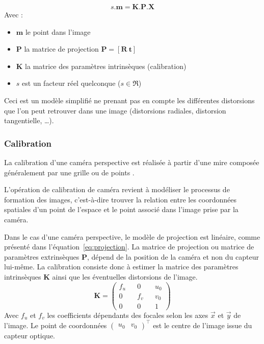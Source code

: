 \begin{equation}
s.\mathbf{m} = \mathbf{K}.\mathbf{P}.\mathbf{X}
\end{equation}
Avec : 
\begin{itemize}
\item $\mathbf{m}$ le point dans l'image
\item $\mathbf{P}$ la matrice de projection 
$\mathbf{P} = [ \mathbf{R} ~ \mathbf{t} ]$
\item $\mathbf{K}$ la matrice des paramètres intrinsèques (calibration)
\item $s$ est un facteur réel quelconque ($s \in \Re$)
\end{itemize}

Ceci est un modèle simplifié ne prenant pas en compte les différentes distorsions que l'on peut retrouver dans une image (distorsions radiales, distorsion tangentielle, \dots).

\subsubsection{Calibration}
\label{subsub:calibration}
La calibration d'une caméra perspective est réalisée à partir d'une mire composée généralement par une grille ou de points \cite{HoraudBook, Hartley03Book}.

L'opération de calibration de caméra revient à modéliser le processus de formation des images, c'est-à-dire trouver la relation entre les coordonnées spatiales d'un point de l'espace et le point associé dans l'image prise par la caméra.

Dans le cas d'une caméra perspective, le modèle de projection est linéaire, comme présenté dans l'équation~\ref{eq:projection}.
La matrice de projection ou matrice de paramètres extrinsèques $\mathbf{P}$, dépend de la position de la caméra et non du capteur lui-même.
La calibration consiste donc à estimer la matrice des paramètres intrinsèques $\mathbf{K}$ ainsi que les éventuelles distorsions de l'image.
$$
\mathbf{K} = \begin{pmatrix}f_u && 0 && u_0 \\ 0 && f_v && v_0 \\ 0 && 0 && 1\end{pmatrix} 
$$
Avec $f_u$ et $f_v$ les coefficients dépendants des focales selon les axes $\vec{x}$ et $\vec{y}$ de l'image.
Le point de coordonnées $\begin{pmatrix}u_0&v_0\end{pmatrix}^\top$ est le centre de l'image issue du capteur optique.

